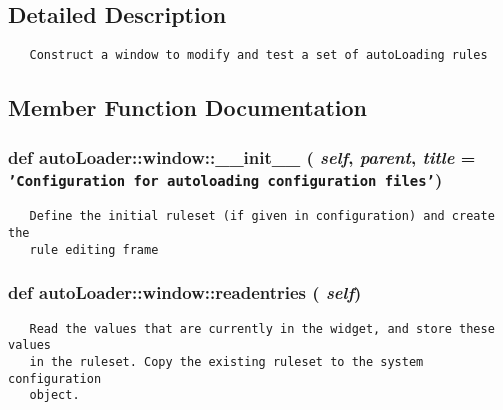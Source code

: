 \subsection{Detailed Description}


\footnotesize\begin{verbatim}
   Construct a window to modify and test a set of autoLoading rules
\end{verbatim}
\normalsize
 



\subsection{Member Function Documentation}
\subsubsection{\setlength{\rightskip}{0pt plus 5cm}def auto\-Loader::window::\_\-\_\-init\_\-\_\- ( {\em self},  {\em parent},  {\em title} = {\tt 'Configuration~for~autoloading~configuration~files'})}\label{classautoLoader_1_1window_be05368f9b50de9a67dbaa6b8a668263}




\footnotesize\begin{verbatim}
   Define the initial ruleset (if given in configuration) and create the
   rule editing frame
\end{verbatim}
\normalsize
\subsubsection{\setlength{\rightskip}{0pt plus 5cm}def auto\-Loader::window::readentries ( {\em self})}\label{classautoLoader_1_1window_b05cd8b1b0902a674b9976d04673959a}




\footnotesize\begin{verbatim}
   Read the values that are currently in the widget, and store these values
   in the ruleset. Copy the existing ruleset to the system configuration
   object.
\end{verbatim}
\normalsize
